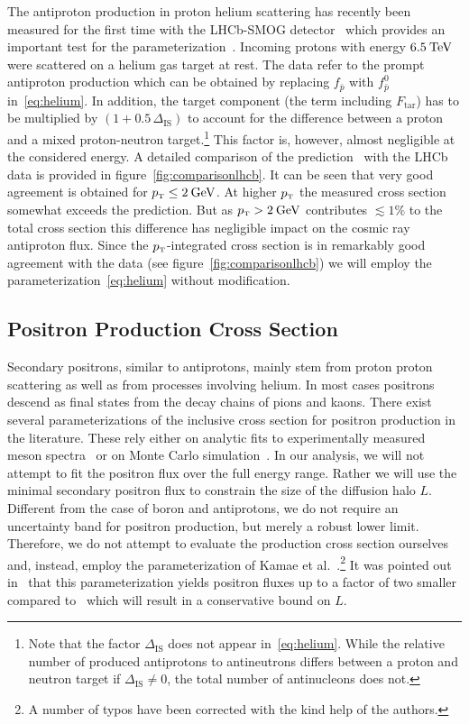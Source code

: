 \documentclass[a4paper,11pt]{article}
\newcommand{\eVdist}{\kern-0.06em}
\newcommand{\gev}{\:\text{Ge\eVdist V}}
\newcommand{\tev}{\:\text{Te\eVdist V}}
\newcommand{\pt}{p_{\text{\tiny{T}}}}
\newcommand{\iso}{\ensuremath{\Delta_{\text{IS}}}}
\begin{document}
The antiproton production in proton helium scattering has recently been measured for the first time with the LHCb-SMOG detector~\cite{LHCb:2017tqz} which provides an important test for the parameterization~\cite{Winkler:2017xor}. Incoming protons with energy $6.5\tev$ were scattered on a helium gas target at rest. The data refer to the prompt antiproton production which can be obtained by replacing $f_{\bar{p}}$ with $f_{\bar{p}}^0$ in~\eqref{eq:helium}. In addition, the target component (the term including $F_\text{tar}$) has to be multiplied by $(1+0.5\,\iso)$ to account for the difference between a proton and a mixed proton-neutron target.\footnote{Note that the factor $\iso$ does not appear in~\eqref{eq:helium}. While the relative number of produced antiprotons to antineutrons differs between a proton and neutron target if $\iso \neq 0$, the total number of antinucleons does not.} This factor is, however, almost negligible at the considered energy.
A detailed comparison of the prediction~\cite{Winkler:2017xor} with the LHCb data is provided in figure~\ref{fig:comparisonlhcb}. It can be seen that very good agreement is obtained for $\pt\leq 2\gev$. At higher $\pt$ the measured cross section somewhat exceeds the prediction. But as $\pt > 2\gev$ contributes $\lesssim 1\%$ to the total cross section this difference has negligible impact on the cosmic ray antiproton flux. Since the $\pt$-integrated cross section is in remarkably good agreement with the data (see figure~\ref{fig:comparisonlhcb}) we will employ the parameterization~\eqref{eq:helium} without modification.



\subsection{Positron Production Cross Section}

Secondary positrons, similar to antiprotons, mainly stem from proton proton scattering as well as from processes involving helium. In most cases positrons descend as final states from the decay chains of pions and kaons. There exist several parameterizations of the inclusive cross section for positron production in the literature. These rely either on analytic fits to experimentally measured meson spectra~\cite{Badhwar:1977,Tan:1984ha,Blum:2017iol} or on Monte Carlo simulation~\cite{Kamae:2006bf}. In our analysis, we will not attempt to fit the positron flux over the full energy range. Rather we will use the minimal secondary positron flux to constrain the size of the diffusion halo $L$. Different from the case of boron and antiprotons, we do not require an uncertainty band for positron production, but merely a robust lower limit. Therefore, we do not attempt to evaluate the production cross section ourselves and, instead, employ the parameterization of Kamae et al.~\cite{Kamae:2006bf}.\footnote{A number of typos have been corrected with the kind help of the authors.} It was pointed out in~\cite{Delahaye:2008ua} that this parameterization yields positron fluxes up to a factor of two smaller compared to~\cite{Badhwar:1977,Tan:1984ha} which will result in a conservative bound on $L$.
\end{document}
